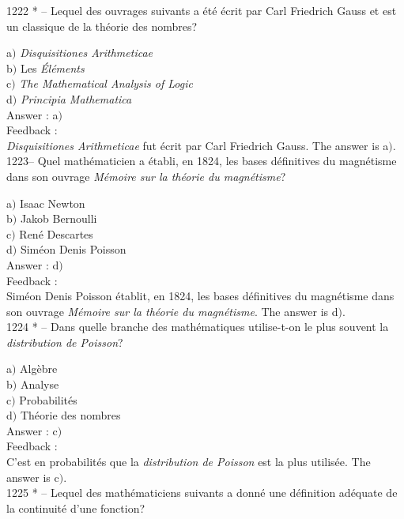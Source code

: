 \documentclass[letterpaper, 12pt]{article}
\begin{document}
1222 * -- Lequel des ouvrages suivants a \'et\'e \'ecrit par Carl
Friedrich Gauss et est un classique de la th\'eorie des nombres?

a$)$ {\sl Disquisitiones Arithmeticae} \\
b$)$ Les {\sl \'El\'ements} \\
c$)$ {\sl The Mathematical Analysis of Logic} \\
d$)$ {\sl Principia Mathematica}\\

Answer : a$)$\\

Feedback : \\
{\sl Disquisitiones Arithmeticae} fut \'ecrit par Carl Friedrich
Gauss.
The answer is a$)$.\\

1223-- Quel math\'ematicien a \'etabli, en 1824, les bases
d\'efinitives du magn\'etisme dans son ouvrage {\sl M\'emoire sur la
th\'eorie du magn\'etisme}?

a$)$ Isaac Newton \\
b$)$ Jakob Bernoulli \\
c$)$ Ren\'e Descartes \\
d$)$ Sim\'eon Denis Poisson\\

Answer : d$)$\\

Feedback : \\
Sim\'eon Denis Poisson \'etablit, en 1824, les bases d\'efinitives
du magn\'etisme dans son ouvrage {\sl M\'emoire sur la th\'eorie du
magn\'etisme}.
The answer is d$)$.\\

1224 * -- Dans quelle branche des math\'ematiques utilise-t-on le
plus souvent la {\sl distribution de Poisson}?

a$)$ Alg\`ebre \\
b$)$ Analyse \\
c$)$ Probabilit\'es \\
d$)$ Th\'eorie des nombres\\

Answer : c$)$\\

Feedback : \\
C'est en probabilit\'es que la {\sl distribution de Poisson} est la plus
utilis\'ee.
The answer is c$)$.\\

1225 * -- Lequel des math\'ematiciens suivants a donn\'e une
d\'efinition ad\'equate de la continuit\'e d'une fonction?
\end{document}
